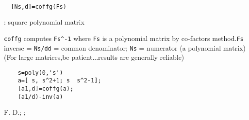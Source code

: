 
\begin{mandesc}
   \\ %
\end{mandesc}
\begin{calling_sequence}
\begin{verbatim}
  [Ns,d]=coffg(Fs)   
\end{verbatim}
\end{calling_sequence}
\begin{parameters}
  \begin{varlist}
    : square polynomial matrix
  \end{varlist}
\end{parameters}
\begin{mandescription}
  \verb!coffg! computes \verb!Fs^-1! where \verb!Fs! is a polynomial
  matrix by co-factors method.\verb!Fs! inverse = \verb!Ns/d!\verb!d! = common denominator; \verb!Ns! =  numerator (a polynomial matrix)
  (For large matrices,be patient...results are generally reliable)
\end{mandescription}
\begin{examples}
  \begin{Verbatim}
    s=poly(0,'s')
    a=[ s, s^2+1; s  s^2-1];
    [a1,d]=coffg(a);
    (a1/d)-inv(a)
  \end{Verbatim}
\end{examples}
\begin{manseealso}
        
\end{manseealso}
\begin{authors}
  F. D.; ;   
\end{authors}
